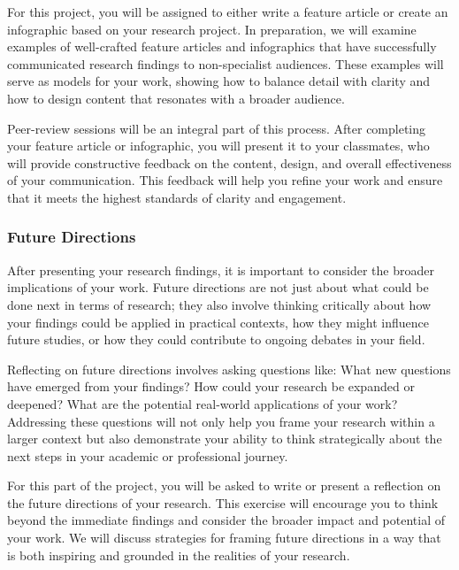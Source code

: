 \documentclass[
]{book}
\begin{document}
For this project, you will be assigned to either write a feature article or create an infographic based on your research project. In preparation, we will examine examples of well-crafted feature articles and infographics that have successfully communicated research findings to non-specialist audiences. These examples will serve as models for your work, showing how to balance detail with clarity and how to design content that resonates with a broader audience.

Peer-review sessions will be an integral part of this process. After completing your feature article or infographic, you will present it to your classmates, who will provide constructive feedback on the content, design, and overall effectiveness of your communication. This feedback will help you refine your work and ensure that it meets the highest standards of clarity and engagement.

\subsubsection{Future Directions}\label{future-directions}

After presenting your research findings, it is important to consider the broader implications of your work. Future directions are not just about what could be done next in terms of research; they also involve thinking critically about how your findings could be applied in practical contexts, how they might influence future studies, or how they could contribute to ongoing debates in your field.

Reflecting on future directions involves asking questions like: What new questions have emerged from your findings? How could your research be expanded or deepened? What are the potential real-world applications of your work? Addressing these questions will not only help you frame your research within a larger context but also demonstrate your ability to think strategically about the next steps in your academic or professional journey.

For this part of the project, you will be asked to write or present a reflection on the future directions of your research. This exercise will encourage you to think beyond the immediate findings and consider the broader impact and potential of your work. We will discuss strategies for framing future directions in a way that is both inspiring and grounded in the realities of your research.
\end{document}
